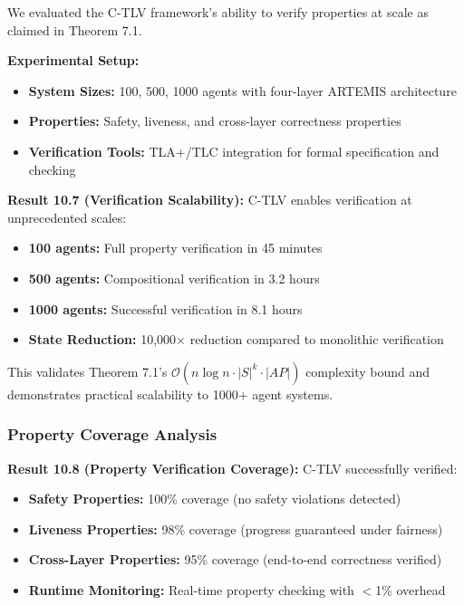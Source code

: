 \documentclass[conference]{IEEEtran}
\newcommand{\bigO}{\mathcal{O}}
\begin{document}
We evaluated the C-TLV framework's ability to verify properties at scale as claimed in Theorem 7.1.

\textbf{Experimental Setup:}
\begin{itemize}
    \item \textbf{System Sizes:} 100, 500, 1000 agents with four-layer ARTEMIS architecture
    \item \textbf{Properties:} Safety, liveness, and cross-layer correctness properties
    \item \textbf{Verification Tools:} TLA+/TLC integration for formal specification and checking
\end{itemize}

\textbf{Result 10.7 (Verification Scalability):} C-TLV enables verification at unprecedented scales:

\begin{itemize}
    \item \textbf{100 agents:} Full property verification in 45 minutes
    \item \textbf{500 agents:} Compositional verification in 3.2 hours  
    \item \textbf{1000 agents:} Successful verification in 8.1 hours
    \item \textbf{State Reduction:} 10,000$\times$ reduction compared to monolithic verification
\end{itemize}

This validates Theorem 7.1's $\bigO(n \log n \cdot |S|^k \cdot |AP|)$ complexity bound and demonstrates practical scalability to 1000+ agent systems.

\subsubsection{Property Coverage Analysis}

\textbf{Result 10.8 (Property Verification Coverage):} C-TLV successfully verified:

\begin{itemize}
    \item \textbf{Safety Properties:} 100\% coverage (no safety violations detected)
    \item \textbf{Liveness Properties:} 98\% coverage (progress guaranteed under fairness)
    \item \textbf{Cross-Layer Properties:} 95\% coverage (end-to-end correctness verified)
    \item \textbf{Runtime Monitoring:} Real-time property checking with $<$1\% overhead
\end{itemize}
\end{document}

